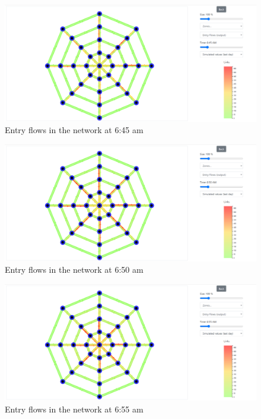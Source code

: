 \documentclass[a4paper, 12pt,oneside]{article}
\begin{document}
\begin{minipage}[c]{0.5\textwidth}
\begin{figure}[H]
    \centering
    \includegraphics[width=1\textwidth]{Images/Step2/results_on_network_645am.png}
    \caption{Entry flows in the network at 6:45 am}
    \label{fig:Entry flows in the network at 6:45 am}
\end{figure}
\end{minipage}
\begin{minipage}[c]{0.5\textwidth}
\begin{figure}[H]
    \centering
    \includegraphics[width=1\textwidth]{Images/Step2/results_on_network_650am.png}
    \caption{Entry flows in the network at 6:50 am}
    \label{fig:Entry flows in the network at 6:50 am}
\end{figure}
\end{minipage}
\begin{minipage}[c]{0.5\textwidth}
\begin{figure}[H]
    \centering
    \includegraphics[width=1\textwidth]{Images/Step2/results_on_network_655am.png}
    \caption{Entry flows in the network at 6:55 am}
    \label{fig:Entry flows in the network at 6:55 am}
\end{figure}
\end{minipage}
\end{document}
